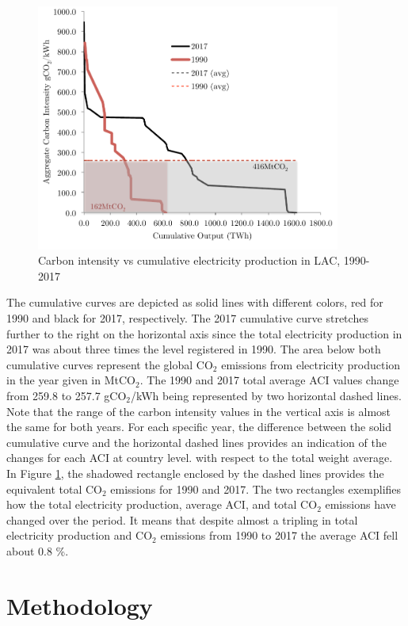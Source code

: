 \documentclass[energies,article,accept,moreauthors,12pt,a4paper]{mdpi} %
\begin{document}
               \begin{figure}[ht] \centerline{
     \includegraphics[width=10cm]{images/cumglobACI.pdf}}
       \caption{Carbon intensity vs cumulative electricity production in LAC,  1990-2017}
      \label{cumglobACI}
        \end{figure}

The cumulative curves are depicted as solid lines with different colors, red for 1990 and black for 2017, respectively. 
The 2017 cumulative curve stretches further to the right on the horizontal axis since the total electricity production in 2017 was about three times the level registered in 1990. The area below both cumulative curves represent the global CO$_2$ emissions from electricity production in the year given in MtCO$_2$. The 1990 and 2017 total average ACI values change from 259.8 to 257.7 gCO$_2$/kWh being represented by two horizontal
 dashed lines. Note that the range of the carbon intensity values in the vertical axis is almost the same for both years. 
For each specific year, the difference
between the solid cumulative curve and the horizontal dashed lines provides
an indication of the changes for each ACI at country level.
with respect to the total weight average. In Figure \ref{cumglobACI}, the shadowed rectangle enclosed by the dashed lines
 provides the equivalent
total CO$_2$ emissions for 1990 and 2017.  The two rectangles exemplifies how the
 total electricity production, average ACI, and
 total CO$_2$ emissions have changed over the period.
 It means that despite almost
a tripling in total electricity production and CO$_2$ emissions from 1990 to 2017 the average ACI
fell about 0.8 \%.
	
																						
\section{Methodology}  \label{sec4}
\end{document}
